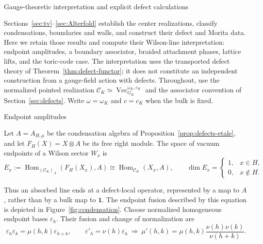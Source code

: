 \documentclass[12pt]{amsart}
\makeatletter
\renewcommand\section{\@startsection{section}{1}%
  \z@{.7\linespacing\@plus\linespacing}{.5\linespacing}%
  {\normalfont\bfseries\centering}}
\renewcommand\subsection{\@startsection{subsection}{2}%
  \z@{.5\linespacing\@plus.7\linespacing}{-.5em}%
  {\normalfont\bfseries}}
\numberwithin{equation}{section}
\theoremstyle{definition}
\makeatother
\begin{document}
\section{Gauge-theoretic interpretation and explicit defect calculations}
\label{sec:gauge-defect}

Sections~\ref{sec:tv}--\ref{sec:Alterfold} establish the center realizations,
classify condensations, boundaries and walls, and construct their defect
and Morita data. Here we retain those results and compute their Wilson-line
interpretation: endpoint amplitudes, a boundary associator, braided
attachment phases, lattice lifts, and the toric-code case.
The interpretation uses the transported defect theory of
Theorem~\ref{thm:defect-functor}; it does not constitute an independent
construction from a gauge-field action with defects.
Throughout, use the normalized pointed realization
$\mathcal C_K\simeq\operatorname{Vec}_{G_K}^{\omega_K,c_K}$ and the
associator convention of Section~\ref{sec:defects}. Write
$\omega=\omega_K$ and $c=c_K$ when the bulk is fixed.

\subsection{Endpoint amplitudes}

Let $A=A_{H,\mu}$ be the condensation algebra of
Proposition~\ref{prop:defects-etale}, and let
$F_H(X)=X\otimes A$ be its free right module. The space of vacuum
endpoints of a Wilson sector $W_x$ is
\begin{equation}
\label{eq:gauge-endpoint-space}
E_x:=\operatorname{Hom}_{(\mathcal C_K)_A}(F_H(X_x),A)
\cong\operatorname{Hom}_{\mathcal C_K}(X_x,A),
\qquad
\dim E_x=\begin{cases}1,&x\in H,\\0,&x\notin H.\end{cases}
\end{equation}

Thus an absorbed line ends at a defect-local operator, represented by a
map to $A$, rather than by a bulk map to $\mathbf1$. The endpoint fusion described by this equation is depicted in Figure~\ref{fig:condensation}. Choose normalized homogeneous endpoint bases $\varepsilon_h$.
Their fusion and change of normalization are
\begin{equation}
\label{eq:gauge-endpoint-bases}
\varepsilon_h\varepsilon_k=\mu(h,k)\varepsilon_{h+k},
\qquad
\varepsilon'_h=\nu(h)\varepsilon_h
\ \Longrightarrow\ 
\mu'(h,k)=\mu(h,k)\frac{\nu(h)\nu(k)}{\nu(h+k)}.
\end{equation}
\end{document}
